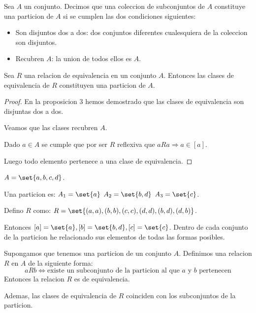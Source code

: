 \begin{definition}[Partición]
	Sea \(A \) un conjunto. Decimos que una coleccion de subconjuntos de \(A \) constituye una particion de \(A \) si se cumplen las dos condiciones siguientes:
	\begin{itemize}
		\item Son disjuntos dos a dos: dos conjuntos diferentes cualesquiera de la coleccion son disjuntos.
		\item Recubren \(A\): la union de todos ellos es \(A \).
	\end{itemize}
\end{definition}

\begin{theorem}
	Sea \(R \) una relacion de equivalencia en un conjunto \(A \). Entonces las clases de equivalencia de \(R \) constituyen una particion de \(A \).
\end{theorem}
\begin{proof}
	En la proposicion 3 hemos demostrado que las clases de equivalencia son disjuntas dos a dos.

	Veamos que las clases recubren \(A \).

	Dado \(a \in A \) se cumple que por ser \(R \) reflexiva que \(aRa \Rightarrow a \in [a]\).

	Luego todo elemento pertenece a una clase de equivalencia.
\end{proof}

\begin{example}
	\(A = \set{a,b,c,d }\).

	Una particion es: \(A_1 = \set{a }\) \(A_2 = \set{b,d }\) \(A_3 = \set{c}\).

	Defino \(R \) como: \(R = \set{(a,a), (b,b), (c,c), (d,d), (b,d), (d,b)}\).

	Entonces \([a] = \set{a}, [b] =  \set{b,d}, [c] = \set{c}\). Dentro de cada conjunto de la particion he relacionado sus elementos de todas las formas posibles.
\end{example}

\begin{theorem}
	Supongamos que tenemos una particion de un conjunto \(A \). Definimos una relacion \(R \) en \(A \) de la siguiente forma:
	\[
		aRb \iff  \text{existe un subconjunto de la particion al que } a \text{ y } b \text{ pertenecen}
	\]
	Entonces la relacion \(R \) es de equivalencia.

	Ademas, las clases de equivalencia de \(R \) coinciden con los subconjuntos de la particion.
\end{theorem}

